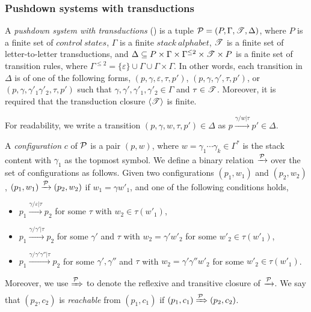 \subsubsection{Pushdown systems with transductions}


\begin{definition} \label{def:trpds}
    A \emph{pushdown system with transductions} (\TrPDS) is a tuple ${\mathcal{P} } = (P, \Gamma, {\mathscr{T} }, \Delta)$, 
    where $P$ is a finite set of $control\ states$, $\Gamma$ is a finite $stack\ alphabet$, ${\mathscr{T} }$ is a finite set of letter-to-letter transductions, and $\Delta \subseteq P \times \Gamma \times \Gamma^{\le 2} \times {\mathscr{T} } \times P$ is a finite set of transition rules, where $\Gamma^{\le 2} = \{\varepsilon\} \cup \Gamma \cup \Gamma \times \Gamma$. In other words, each transition in $\Delta$ is of one of the following forms, $(p, \gamma, \varepsilon, \tau, p')$, $(p, \gamma, \gamma',\tau, p')$, or $(p, \gamma, \gamma'_1 \gamma'_2, \tau, p')$ such that $\gamma, \gamma', \gamma'_1, \gamma'_2 \in \Gamma$ and $\tau \in {\mathscr{T} }$. 
   Moreover, it is required that the transduction closure $\langle {\mathscr{T} } \rangle$ is finite.  
\end{definition}
For readability, we write a transition $(p, \gamma, w, \tau, p') \in \Delta$ as $p \xrightarrow{\gamma/w | \tau} p' \in \Delta$.

A \emph{configuration} $c$ of ${\mathcal{P} }$ is a pair $(p, w)$, where $w = \gamma_1 \cdots \gamma_k \in \Gamma^*$ is the  stack content with $\gamma_1$ as the topmost symbol. We define a binary relation $\xrightarrow{{\mathcal{P} }}$ over the set of configurations as follows. Given two configurations $(p_1, w_1)$ and $(p_2, w_2)$, $(p_1, w_1) \xrightarrow{{\mathcal{P} }} (p_2, w_2)$ if $w_1 = \gamma w'_1$, and one of the following conditions holds,
\begin{itemize}
\item $p_1 \xrightarrow{\gamma/\varepsilon|\tau} p_2$ for some $\tau$ with  $w_2 \in \tau(w'_1)$, 
%
\item $p_1 \xrightarrow{\gamma/\gamma'|\tau} p_2$ for some $\gamma'$ and $\tau$ with $w_2 = \gamma' w'_2$ for some $w'_2 \in \tau(w'_1)$, 
%
\item $p_1 \xrightarrow{\gamma/\gamma' \gamma''|\tau} p_2$ for some $\gamma', \gamma''$ and $\tau$ with $w_2 = \gamma' \gamma'' w'_2$ for some $w'_2 \in \tau(w'_1)$.
\end{itemize}
Moreover, we use $\xRightarrow{{\mathcal{P} }}$ to denote the reflexive and transitive closure of $\xrightarrow{{\mathcal{P} }}$. We say that $(p_2, c_2)$ is \emph{reachable} from $(p_1, c_1)$ if $(p_1, c_1) \xRightarrow{{\mathcal{P} }} (p_2, c_2)$.

